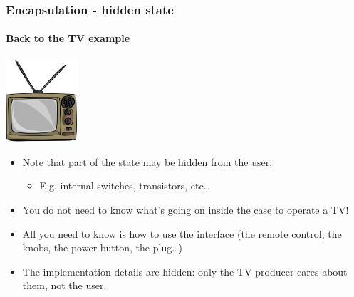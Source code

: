 \documentclass[9pt]{beamer}
\begin{document}
\begin{frame}
  \frametitle{Encapsulation - hidden state}
  \framesubtitle{Back to the TV example}
  
  \centering\includegraphics[width=0.2\textwidth]{television.png}
  
  \bigskip
  
  \begin{itemize}
  \item Note that part of the state may be hidden from the user:
    \begin{itemize}
    \item E.g. internal switches, transistors, etc\dots
    \end{itemize}
  \smallskip
  \item You do not need to know what's going on inside the case to operate a TV!
  \smallskip
  \item All you need to know is how to use the \alert{interface} (the remote
        control, the knobs, the power button, the plug\dots)
  \smallskip
  \item The \alert{implementation} details are hidden: only the TV producer cares about
        them, not the user. 
  \end{itemize}

\end{frame}
\end{document}
